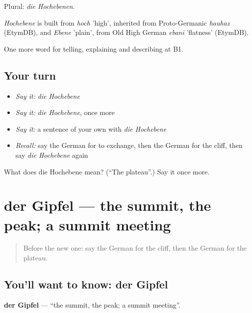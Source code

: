 Plural: \emph{die Hochebenen}.

\begin{cousinweb}
\emph{Hochebene} is built from \emph{hoch} 'high', inherited from Proto-Germanic \emph{hauhaz} (EtymDB), and \emph{Ebene} 'plain', from Old High German \emph{ebanī} 'flatness' (EtymDB).
\end{cousinweb}

\begin{grammarlens}[title={What you've built}]
One more word for telling, explaining and describing at B1.
\end{grammarlens}

\subsection*{Your turn}
\begin{itemize}
\raggedright
  \item \emph{Say it:} \emph{die Hochebene}
  \item \emph{Say it:} \emph{die Hochebene}, once more
  \item \emph{Say it:} a sentence of your own with \emph{die Hochebene}
  \item \emph{Recall:} say the German for to exchange, then the German for the cliff, then say \emph{die Hochebene} again
\end{itemize}

\begin{tcolorbox}[breakable,colback=teal!4,colframe=teal!35!black,title={Before you move on}]
What does die Hochebene mean? (\textquotedblleft{}The plateau\textquotedblright{}.) Say it once more.
\end{tcolorbox}
\section[der Gipfel]{der Gipfel — the summit, the peak; a summit meeting}

\label{lesson:GE-C453-gipfel}



\begin{quote}
Before the new one: say the German for the cliff, then the German for the plateau.
\end{quote}

\subsection*{You'll want to know: der Gipfel}
\textbf{der Gipfel} — \textquotedblleft{}the summit, the peak; a summit meeting\textquotedblright{}.

